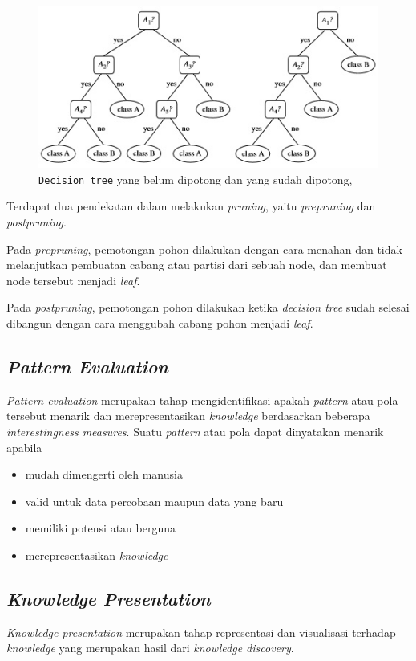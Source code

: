 \begin{figure}
\includegraphics[scale=1]{Gambar/treepruning.jpg}
\caption[\texttt{Decision Tree Pruned}]{\texttt{Decision tree} yang belum dipotong dan yang sudah dipotong, \cite{DM}} 
\label{fig:treePruning}
\end{figure}

Terdapat dua pendekatan dalam melakukan \textsl{pruning}, yaitu \textsl{prepruning} dan \textsl{postpruning}.

Pada \textsl{prepruning}, pemotongan pohon dilakukan dengan cara menahan dan tidak melanjutkan pembuatan cabang atau partisi dari sebuah node, dan membuat node tersebut menjadi \textsl{leaf}. 

Pada \textsl{postpruning}, pemotongan pohon dilakukan ketika \textsl{decision tree} sudah selesai dibangun dengan cara menggubah cabang pohon menjadi \textsl{leaf}.

\subsection{\textsl{Pattern Evaluation}}
\textsl{Pattern evaluation} merupakan tahap mengidentifikasi apakah \textsl{pattern} atau pola tersebut menarik dan merepresentasikan \textsl{knowledge} berdasarkan beberapa \textsl{interestingness measures}.
Suatu \textsl{pattern} atau pola dapat dinyatakan menarik apabila
\begin{itemize}
	\item mudah dimengerti oleh manusia
	\item valid untuk data percobaan maupun data yang baru
	\item memiliki potensi atau berguna
	\item merepresentasikan \textsl{knowledge}
\end{itemize}

\subsection{\textsl{Knowledge Presentation}}
\textsl{Knowledge presentation} merupakan tahap representasi dan visualisasi terhadap \textsl{knowledge} yang merupakan hasil dari \textsl{knowledge discovery}.	

